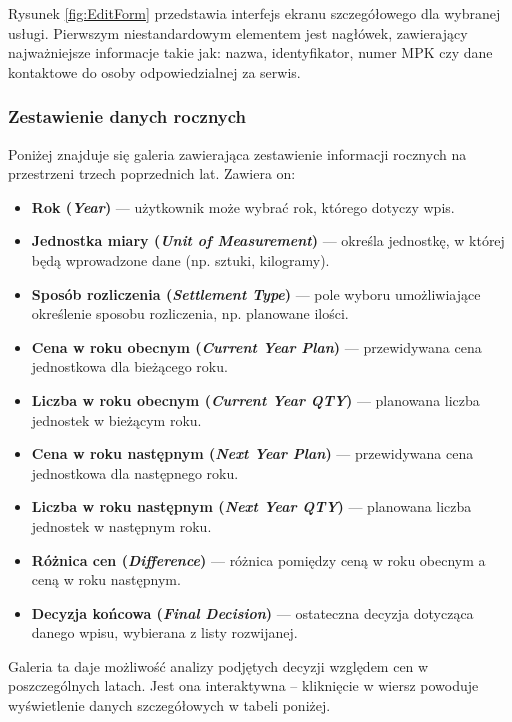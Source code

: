 Rysunek \ref{fig:EditForm} przedstawia interfejs ekranu szczegółowego dla wybranej usługi. Pierwszym niestandardowym elementem jest nagłówek, zawierający najważniejsze informacje takie jak: nazwa, identyfikator, numer MPK czy dane kontaktowe do osoby odpowiedzialnej za serwis.
\subsubsection*{Zestawienie danych rocznych}
Poniżej znajduje się galeria zawierająca zestawienie informacji rocznych na przestrzeni trzech poprzednich lat. Zawiera on:
\begin{itemize}
    \item \textbf{Rok (\emph{Year})} — użytkownik może wybrać rok, którego dotyczy wpis.
    \item \textbf{Jednostka miary (\emph{Unit of Measurement})} — określa jednostkę, w której będą wprowadzone dane (np. sztuki, kilogramy).
    \item \textbf{Sposób rozliczenia (\emph{Settlement Type})} — pole wyboru umożliwiające określenie sposobu rozliczenia, np. planowane ilości.
    \item \textbf{Cena w roku obecnym (\emph{Current Year Plan})} — przewidywana cena jednostkowa dla bieżącego roku.
    \item \textbf{Liczba w roku obecnym (\emph{Current Year QTY})} — planowana liczba jednostek w bieżącym roku.
    \item \textbf{Cena w roku następnym (\emph{Next Year Plan})} — przewidywana cena jednostkowa dla następnego roku.
    \item \textbf{Liczba w roku następnym (\emph{Next Year QTY})} — planowana liczba jednostek w następnym roku.
    \item \textbf{Różnica cen (\emph{Difference})} — różnica pomiędzy ceną w roku obecnym a ceną w roku następnym.
    \item \textbf{Decyzja końcowa (\emph{Final Decision})} — ostateczna decyzja dotycząca danego wpisu, wybierana z listy rozwijanej.
\end{itemize}

Galeria ta daje możliwość analizy podjętych decyzji względem cen w poszczególnych latach. Jest ona interaktywna -- kliknięcie w wiersz powoduje wyświetlenie danych szczegółowych w tabeli poniżej.
